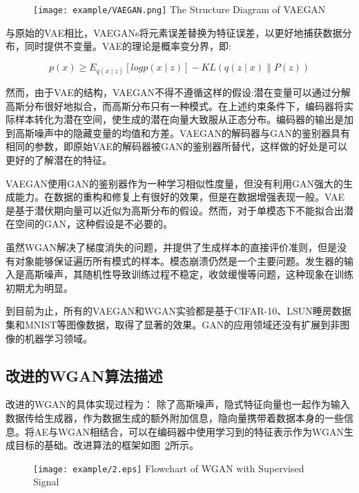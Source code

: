 \begin{figure}[htbp]
	\centering
	\texttt{[image: example/VAEGAN.png]}
	{The Structure Diagram of VAEGAN}
	\label{figVAEGAN}
\end{figure}

与原始的VAE相比，VAEGANs将元素误差替换为特征误差，以更好地捕获数据分布，同时提供不变量\cite{7}。VAE的理论是概率变分界\cite{16}，即:

\begin{equation}
\label{eq18}
p(x)\geq E_{q(x\mid z)}[log p (x\mid z)]- KL(q(z\mid x)\parallel P (z))
\end{equation}

然而，由于VAE的结构，VAEGAN不得不遵循这样的假设:潜在变量可以通过分解高斯分布很好地拟合，而高斯分布只有一种模式。在上述约束条件下，编码器将实际样本转化为潜在空间，使生成的潜在向量大致服从正态分布。编码器的输出是加到高斯噪声中的隐藏变量的均值和方差。VAEGAN的解码器与GAN的鉴别器具有相同的参数，即原始VAE的解码器被GAN的鉴别器所替代，这样做的好处是可以更好的了解潜在的特征。

VAEGAN使用GAN的鉴别器作为一种学习相似性度量，但没有利用GAN强大的生成能力。在数据的重构和修复上有很好的效果，但是在数据增强表现一般。VAE是基于潜伏期向量可以近似为高斯分布的假设。然而，对于单模态下不能拟合出潜在空间的GAN，这种假设是不必要的。

虽然WGAN解决了梯度消失的问题，并提供了生成样本的直接评价准则，但是没有对象能够保证遍历所有模式的样本。模态崩溃仍然是一个主要问题。发生器的输入是高斯噪声，其随机性导致训练过程不稳定，收敛缓慢\cite{17}等问题，这种现象在训练初期尤为明显。

到目前为止，所有的VAEGAN和WGAN实验都是基于CIFAR-10、LSUN睡房数据集和MNIST等图像数据，取得了显著的效果。GAN的应用领域还没有扩展到非图像的机器学习领域。

\subsection{改进的WGAN算法描述}
改进的WGAN的具体实现过程为：
除了高斯噪声，隐式特征向量也一起作为输入数据传给生成器，作为数据生成的额外附加信息，隐向量携带着数据本身的一些信息。将AE与WGAN相结合，可以在编码器中使用学习到的特征表示作为WGAN生成目标的基础。改进算法的框架如图~\ref{fig2}所示。

\begin{figure}[!htp]
	\centering
	\texttt{[image: example/2.eps]}
	{Flowchart of WGAN with Supervised Signal}
	\label{fig2}
\end{figure}

